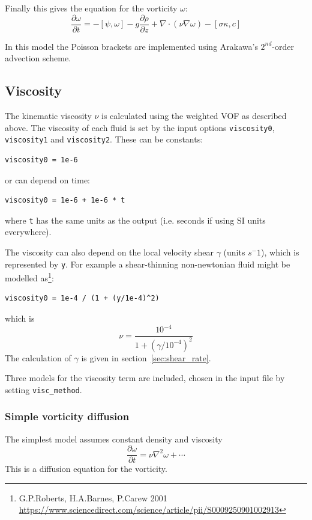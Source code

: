 \documentclass[12pt,a4paper]{article}
\begin{document}
Finally this gives the equation for the vorticity $\omega$:
\begin{equation}
\frac{\partial\omega}{\partial t} = -\left[\psi, \omega\right] - g\frac{\partial\rho}{\partial z} + \nabla\cdot\left(\nu\nabla \omega\right) - \left[\sigma\kappa, c\right]
\end{equation}

In this model the Poisson brackets are implemented using Arakawa's $2^{nd}$-order advection scheme.

\subsection{Viscosity}

The kinematic viscosity $\nu$ is calculated using the weighted VOF as described above. The viscosity of each fluid is set by the input options \texttt{viscosity0}, \texttt{viscosity1} and \texttt{viscosity2}. These can be constants:
\begin{verbatim}
viscosity0 = 1e-6
\end{verbatim}
or can depend on time:
\begin{verbatim}
viscosity0 = 1e-6 + 1e-6 * t
\end{verbatim}
where \texttt{t} has the same units as the output (i.e. seconds if using SI units everywhere).

The viscosity can also depend on the local velocity shear $\gamma$ (units $s^-1$), which is represented by \texttt{y}. For example a shear-thinning non-newtonian fluid might be modelled as\footnote{G.P.Roberts, H.A.Barnes, P.Carew 2001 \url{https://www.sciencedirect.com/science/article/pii/S0009250901002913}}:
\begin{verbatim}
viscosity0 = 1e-4 / (1 + (y/1e-4)^2)
\end{verbatim}
which is
\[
\nu = \frac{10^{-4}}{1 + \left(\gamma/10^{-4}\right)^2}
\]
The calculation of $\gamma$ is given in section~\ref{sec:shear_rate}.

Three models for the viscosity term are included, chosen in the input file
by setting \texttt{visc\_method}.

\subsubsection{Simple vorticity diffusion}
\label{sec:visc0}

The simplest model assumes constant density and viscosity
\begin{equation}
  \frac{\partial\omega}{\partial t} = \nu\nabla^2\omega + \cdots
  \label{eq:vorticity_visc}
\end{equation}
This is a diffusion equation for the vorticity.
\end{document}
